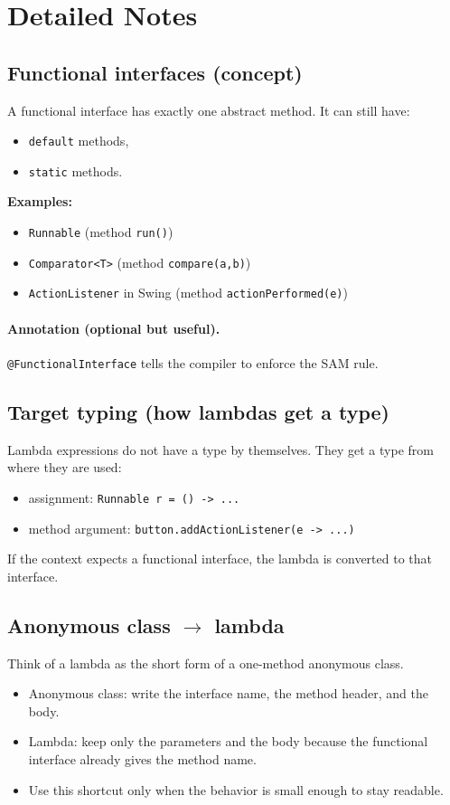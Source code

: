 \documentclass[11pt]{article}
\begin{document}
\section{Detailed Notes}
\subsection{Functional interfaces (concept)}
A functional interface has exactly one abstract method.
It can still have:
\begin{itemize}
  \item \texttt{default} methods,
  \item \texttt{static} methods.
\end{itemize}

\textbf{Examples:}
\begin{itemize}
  \item \texttt{Runnable} (method \texttt{run()})
  \item \texttt{Comparator<T>} (method \texttt{compare(a,b)})
  \item \texttt{ActionListener} in Swing (method \texttt{actionPerformed(e)})
\end{itemize}

\paragraph{Annotation (optional but useful).}
\texttt{@FunctionalInterface} tells the compiler to enforce the SAM rule.

\subsection{Target typing (how lambdas get a type)}
Lambda expressions do not have a type by themselves.
They get a type from where they are used:
\begin{itemize}
  \item assignment: \texttt{Runnable r = () -> ...}
  \item method argument: \texttt{button.addActionListener(e -> ...)}
\end{itemize}
If the context expects a functional interface, the lambda is converted to that interface.

\subsection{\texorpdfstring{Anonymous class $\rightarrow$ lambda}{Anonymous class -> lambda}}
Think of a lambda as the short form of a one-method anonymous class.
\begin{itemize}
  \item Anonymous class: write the interface name, the method header, and the body.
  \item Lambda: keep only the parameters and the body because the functional interface already gives the method name.
  \item Use this shortcut only when the behavior is small enough to stay readable.
\end{itemize}
\end{document}
